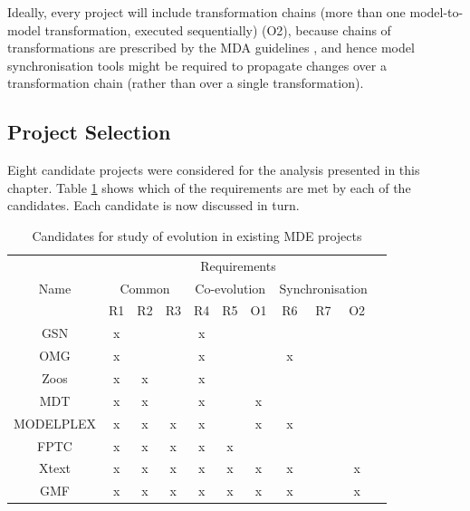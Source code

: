 Ideally, every project will include transformation chains (more than one model-to-model transformation, executed sequentially) (O2), because chains of transformations are prescribed by the MDA guidelines \cite{kleppe03mda}, and hence model synchronisation tools might be required to propagate changes over a transformation chain (rather than over a single transformation).


\subsection{Project Selection}
\label{subsec:project_selection}
Eight candidate projects were considered for the analysis presented in this chapter. Table \ref{tab:candidates} shows which of the requirements are met by each of the candidates. Each candidate is now discussed in turn.

\begin{table}
	\centering
	\begin{tabular}{|c||c|c|c||c|c|c||c|c|c|c|}
		\hline
		\multirow{3}{*}{Name} & \multicolumn{9}{|c|}{Requirements} \\
		\cline{2-10}
		          & \multicolumn{3}{|c||}{Common} & \multicolumn{3}{|c||}{Co-evolution} & \multicolumn{3}{|c|}{Synchronisation} \\
		\cline{2-10}
		          & R1 & R2 & R3 & R4 & R5 & O1 & R6 & R7 & O2 \\
		\hline                                         
		GSN       & x  &    &    & x  &    &    &    &    &    \\
		\hline                                         
		OMG       & x  &    &    & x  &    &    & x  &    &    \\
		\hline                                         
		Zoos      & x  & x  &    & x  &    &    &    &    &    \\
		\hline                                         
		MDT       & x  & x  &    & x  &    & x  &    &    &    \\
		\hline                                         
		MODELPLEX & x  & x  & x  & x  &    & x  & x  &    &    \\
		\hline                                         
		FPTC      & x  & x  & x  & x  & x  &    &    &    &    \\
		\hline                                         
		Xtext     & x  & x  & x  & x  & x  & x  & x  &    & x  \\
		\hline                                         
		GMF       & x  & x  & x  & x  & x  & x  & x  &    & x  \\
		\hline
	\end{tabular}
	\label{tab:candidates}
	\caption{Candidates for study of evolution in existing MDE projects}
\end{table}

